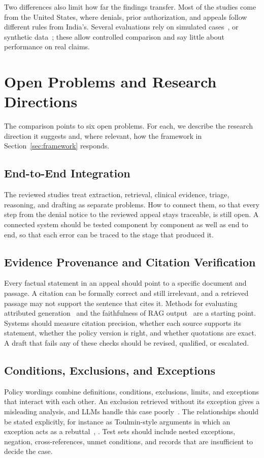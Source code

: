 \documentclass[conference]{IEEEtran}
\begin{document}
Two differences also limit how far the findings transfer. Most of the studies come from the United States, where denials, prior authorization, and appeals follow different rules from India's. Several evaluations rely on simulated cases~\cite{kiser2024}, \cite{deniedai2026} or synthetic data~\cite{inslogicbench2026}; these allow controlled comparison and say little about performance on real claims.

\section{Open Problems and Research Directions}
\label{sec:gaps}
The comparison points to six open problems. For each, we describe the research direction it suggests and, where relevant, how the framework in Section~\ref{sec:framework} responds.

\subsection{End-to-End Integration}
The reviewed studies treat extraction, retrieval, clinical evidence, triage, reasoning, and drafting as separate problems. How to connect them, so that every step from the denial notice to the reviewed appeal stays traceable, is still open. A connected system should be tested component by component as well as end to end, so that each error can be traced to the stage that produced it.

\subsection{Evidence Provenance and Citation Verification}
Every factual statement in an appeal should point to a specific document and passage. A citation can be formally correct and still irrelevant, and a retrieved passage may not support the sentence that cites it. Methods for evaluating attributed generation~\cite{gao2023} and the faithfulness of RAG output~\cite{es2024} are a starting point. Systems should measure citation precision, whether each source supports its statement, whether the policy version is right, and whether quotations are exact. A draft that fails any of these checks should be revised, qualified, or escalated.

\subsection{Conditions, Exclusions, and Exceptions}
Policy wordings combine definitions, conditions, exclusions, limits, and exceptions that interact with each other. An exclusion retrieved without its exception gives a misleading analysis, and LLMs handle this case poorly~\cite{inslogicbench2026}. The relationships should be stated explicitly, for instance as Toulmin-style arguments in which an exception acts as a rebuttal~\cite{prakken2015}, \cite{toulmin2003}. Test sets should include nested exceptions, negation, cross-references, unmet conditions, and records that are insufficient to decide the case.
\end{document}
